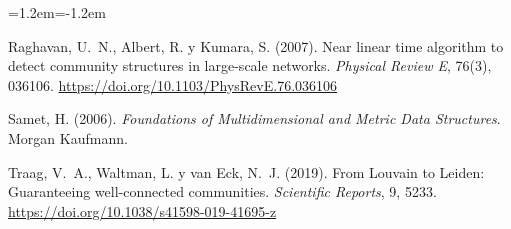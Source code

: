 \documentclass[11pt,letterpaper]{article}
\begin{document}
{\begin{list}{}{\leftmargin=1.2em\itemindent=-1.2em\itemsep=3pt\parsep=0pt}
\item Raghavan, U.~N., Albert, R. y Kumara, S. (2007). Near linear time algorithm to detect community structures in large-scale networks. \emph{Physical Review E}, 76(3), 036106. \url{https://doi.org/10.1103/PhysRevE.76.036106}
\item Samet, H. (2006). \emph{Foundations of Multidimensional and Metric Data Structures}. Morgan Kaufmann.
\item Traag, V.~A., Waltman, L. y van Eck, N.~J. (2019). From Louvain to Leiden: Guaranteeing well-connected communities. \emph{Scientific Reports}, 9, 5233. \url{https://doi.org/10.1038/s41598-019-41695-z}
\end{list}
}
\end{document}

